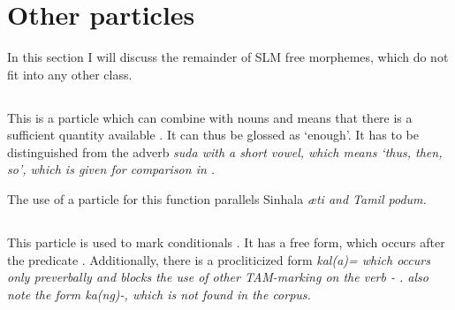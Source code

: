 \section{Other particles}\label{sec:wc:Otherparticles}
In this section I will discuss the remainder of SLM free morphemes, which do not fit into any other class.

\subsection{}\label{sec:wc:suuda}
This is a particle which can  combine with nouns and means that there is a sufficient quantity available . It can thus be glossed as `enough'. It has to be distinguished from the adverb \em suda \em with a short vowel, which means `thus, then, so', which is given for comparison  in .





The use of a  particle for this function parallels Sinhala \em \ae ti \em and Tamil \em podum\em.

 
%






\subsection{}\label{sec:wc:kalu}
This particle is used to mark conditionals . It has a free form, which occurs  after the predicate . Additionally, there is a procliticized form \em kal(a)= \em which occurs only preverbally and blocks the use of other TAM-marking on the verb - \citep[153]{Slomanson2006cll}. \citet{SmithEtAl2004} also note the form \em ka(ng)-\em, which is not found in the corpus.


